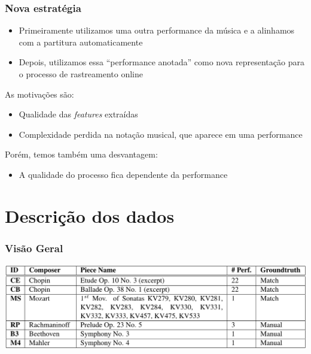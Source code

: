 \documentclass[serif,mathserif]{beamer}
\begin{document}
\begin{frame}
  \frametitle{Nova estratégia}
  \begin{itemize}
    \item Primeiramente utilizamos uma outra performance da música e a alinhamos com a partitura automaticamente\\\pause
    \item Depois, utilizamos essa ``performance anotada'' como nova representação para o processo de rastreamento online\pause
  \end{itemize}



  As motivações são:\pause
  \begin{itemize}
    \item Qualidade das \emph{features} extraídas\\\pause %
    \item Complexidade perdida na notação musical, que aparece em uma performance\pause %
  \end{itemize}
  Porém, temos também uma desvantagem:\pause
  \begin{itemize}
    \item A qualidade do processo fica dependente da performance\\
  \end{itemize}
\end{frame}


\section{Descrição dos dados}
\begin{frame}
  \frametitle{Visão Geral}
  \begin{center}
    \includegraphics[width=\textwidth]{src/img/1-Table1-1.png}
  \end{center}
\end{frame}
\end{document}
